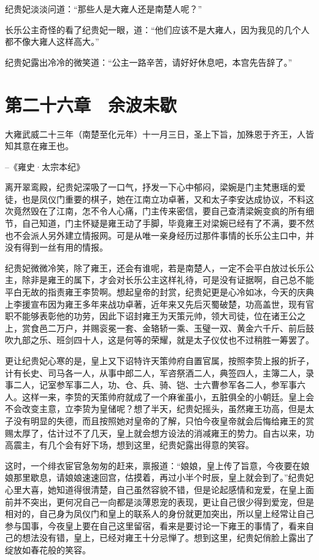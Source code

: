纪贵妃淡淡问道：“那些人是大雍人还是南楚人呢？”

长乐公主奇怪的看了纪贵妃一眼，道：“他们应该不是大雍人，因为我见的几个人都不像大雍人这样高大。”

纪贵妃露出冷冷的微笑道：“公主一路辛苦，请好好休息吧，本宫先告辞了。”

\chapter{第二十六章　余波未歇}

大雍武威二十三年（南楚至化元年）十一月三日，圣上下旨，加殊恩于齐王，人皆知其意在雍王也。

--《雍史·太宗本纪》

离开翠鸾殿，纪贵妃深吸了一口气，抒发一下心中郁闷，梁婉是门主梵惠瑶的爱徒，也是凤仪门重要的棋子，她在江南立功卓著，又和太子李安达成协议，不料这次竟然毁在了江南，怎不令人心痛，门主传来密信，要自己查清梁婉变疯的所有细节，自己知道，门主怀疑是雍王动了手脚，毕竟雍王对梁婉已经有了不满，要不然也不会派人另外建立情报网。可是从唯一亲身经历过那件事情的长乐公主口中，并没有得到一丝有用的情报。

纪贵妃微微冷笑，除了雍王，还会有谁呢，若是南楚人，一定不会平白放过长乐公主，除非是雍王的属下，才会对长乐公主这样礼待，可是没有证据啊，自己总不能平白无故的指责雍王李贽啊。想起皇帝的封赏，纪贵妃更是心冷如冰，今天的庆典上李援宣布因为雍王多年来战功卓著，近年来又先后灭蜀破楚，功高盖世，现有官职不能够表彰他的功劳，因此下诏封雍王为天策元帅，领大司徒，位在诸王公之上，赏食邑二万户，并赐衮冕一套、金辂轿一乘、玉璧一双、黄金六千斤、前后鼓吹九部之乐、班剑四十人，这是何等的荣耀，就是太子仪仗也不过稍胜一筹罢了。

更让纪贵妃心寒的是，皇上又下诏特许天策帅府自置官属，按照李贽上报的折子，计有长史、司马各一人，从事中郎二人，军咨祭酒二人，典签四人，主簿二人，录事二人，记室参军事二人，功、仓、兵、骑、铠、士六曹参军各二人，参军事六人。这样一来，李贽的天策帅府就成了一个麻雀虽小，五脏俱全的小朝廷。皇上会不会改变主意，立李贽为皇储呢？想了半天，纪贵妃摇头，虽然雍王功高，但是太子没有明显的失德，而且按照她对皇帝的了解，只怕今夜皇帝就会后悔给雍王的赏赐太厚了，估计过不了几天，皇上就会想方设法的消减雍王的势力。自古以来，功高震主，有几个会有好下场，想到这里，纪贵妃露出得意的笑容。

这时，一个绯衣宦官急匆匆的赶来，禀报道：“娘娘，皇上传了旨意，今夜要在娘娘那里歇息，请娘娘速速回宫，估摸着，再过小半个时辰，皇上就会到了。”纪贵妃心里大喜，她知道得很清楚，自己虽然容貌不错，但是论起感情和宠爱，在皇上面前并不突出，更何况自己一向都是淡薄恩宠的表现，更让自己很少得到爱宠，但是相对的，自己身为凤仪门和皇上的联系人的身份就更加突出，所以皇上经常让自己参与国事，今夜皇上要在自己这里留宿，看来是要讨论一下雍王的事情了，看来自己的想法没有错，皇上，已经对雍王十分忌惮了。想到这里，纪贵妃俏脸上露出了绽放如春花般的笑容。


